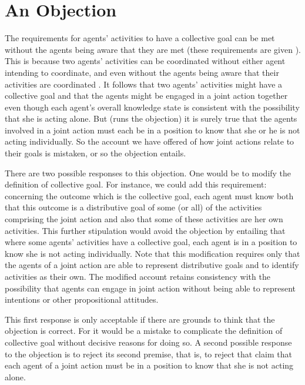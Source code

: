 \documentclass[12pt,a4paper]{extarticle}
\begin{document}
\section{An Objection
	\label{section_objection}
}
The requirements for agents' activities to have a collective goal can be met without the agents being aware that they are met 
(these requirements are given ).  
This is because two agents' activities can be coordinated without either agent intending to coordinate, and even without the agents being aware that their activities are coordinated \citep{Sebanz:2003kf, schmidt_understanding_2010}.
It follows that two agents' activities might have a collective goal 
and that the agents might be engaged in a joint action together
even though each agent's overall knowledge state is consistent with the possibility that she is acting alone.
But (runs the objection) it is surely true that the agents involved in a joint action must each be in a position to know that she or he is not acting individually.
So the account we have offered of how joint actions relate to their goals is mistaken, or so the objection entails.


There are two possible responses to this objection.  One would be to modify the definition of collective goal.
For instance, we could add this requirement: concerning the outcome which is the collective goal, each agent must know both that 
	this outcome is a distributive goal of some (or all) of the activities comprising the joint action 
	and also that 
	some of these activities are her own activities.
This further stipulation would avoid the objection by entailing that where some agents' activities have a collective goal, each agent is in a position to know she is not acting individually.
Note that this modification requires only that the agents of a joint action are able to represent distributive goals and to identify activities as their own.
The modified account retains consistency with the possibility that agents can engage in joint action without being able to represent intentions or other propositional attitudes.

This first response is only acceptable if there are grounds to think that the objection is correct.  
For it would be a mistake to complicate the definition of collective goal  without decisive reasons for doing so.
A second possible response to the objection is to reject its second premise, 
	that is,
	to reject that claim that each agent of a joint action must be in a position to know that she is not acting alone.
	
\end{document}
